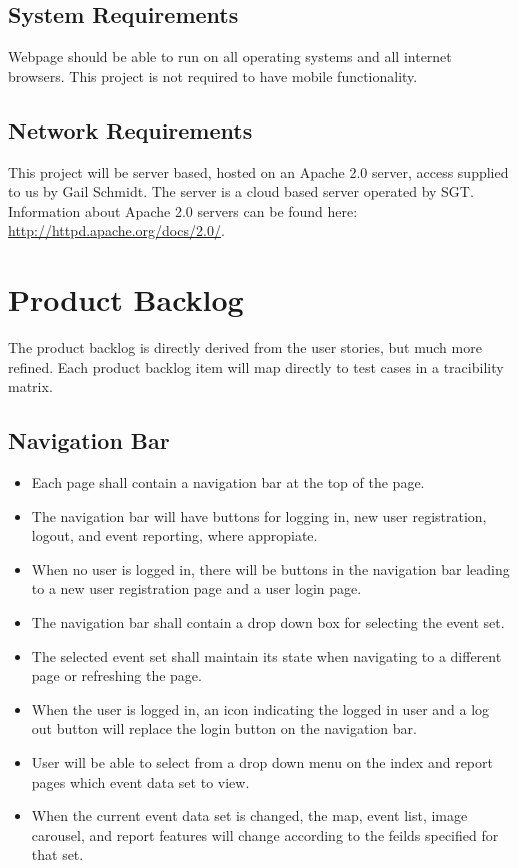 \subsection{System  Requirements}
Webpage should be able to run on all operating systems and all internet browsers. This project is not required to have mobile functionality. 

\subsection{Network Requirements}
This project will be server based, hosted on an Apache 2.0 server, access supplied to us by Gail Schmidt. The server is a cloud based server operated by SGT. Information about Apache 2.0 servers can be found here: \url{http://httpd.apache.org/docs/2.0/}. 

\section{Product Backlog}
The product backlog is directly derived from the user stories, but much more refined. Each product backlog item will map directly to test cases in a tracibility matrix.

\subsection{Navigation Bar}
\begin{itemize}
\item Each page shall contain a navigation bar at the top of the page.
\item The navigation bar will have buttons for logging in, new user registration, logout, and event reporting, where appropiate.
\item When no user is logged in, there will be buttons in the navigation bar leading to a new user registration page and a user login page.
\item The navigation bar shall contain a drop down box for selecting the event set.
\item The selected event set shall maintain its state when navigating to a different page or refreshing the page.
\item When the user is logged in, an icon indicating the logged in user and a log out button will replace the login button on the navigation bar.
\item User will be able to select from a drop down menu on the index and report pages which event data set to view. 
\item When the current event data set is changed, the map, event list, image carousel, and report features will change according to the feilds specified for that set.
\end{itemize}

